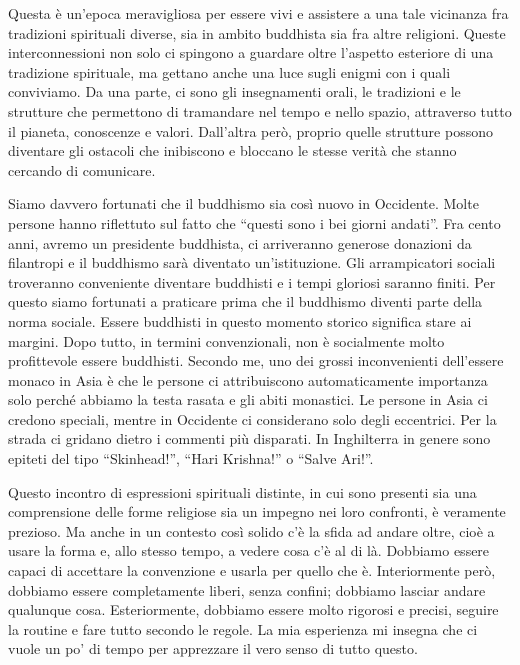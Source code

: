 Questa è un'epoca meravigliosa per essere vivi e assistere a una tale vicinanza fra tradizioni spirituali diverse, sia in ambito buddhista sia fra altre religioni. Queste interconnessioni non solo ci spingono a guardare oltre l'aspetto esteriore di una tradizione spirituale, ma gettano anche una luce sugli enigmi con i quali conviviamo. Da una parte, ci sono gli insegnamenti orali, le tradizioni e le strutture che permettono di tramandare nel tempo e nello spazio, attraverso tutto il pianeta, conoscenze e valori. Dall'altra però, proprio quelle strutture possono diventare gli ostacoli che inibiscono e bloccano le stesse verità che stanno cercando di comunicare. 

Siamo davvero fortunati che il buddhismo sia così nuovo in Occidente. Molte persone hanno riflettuto sul fatto che ``questi sono i bei giorni andati''. Fra cento anni, avremo un presidente buddhista, ci arriveranno generose donazioni da filantropi e il buddhismo sarà diventato un'istituzione. Gli arrampicatori sociali troveranno conveniente diventare buddhisti e i tempi gloriosi saranno finiti. Per questo siamo fortunati a praticare prima che il buddhismo diventi parte della norma sociale. Essere buddhisti in questo momento storico significa stare ai margini. Dopo tutto, in termini convenzionali, non è socialmente molto profittevole essere buddhisti. Secondo me, uno dei grossi inconvenienti dell'essere monaco in Asia è che le persone ci attribuiscono automaticamente importanza solo perché abbiamo la testa rasata e gli abiti monastici. Le persone in Asia ci credono speciali, mentre in Occidente ci considerano solo degli eccentrici. Per la strada ci gridano dietro i commenti più disparati. In Inghilterra in genere sono epiteti del tipo ``Skinhead!'', ``Hari Krishna!'' o ``Salve Ari!''.

Questo incontro di espressioni spirituali distinte, in cui sono presenti sia una comprensione delle forme religiose sia un impegno nei loro confronti, è veramente prezioso. Ma anche in un contesto così solido c'è la sfida ad andare oltre, cioè a usare la forma e, allo stesso tempo, a vedere cosa c'è al di là. Dobbiamo essere capaci di accettare la convenzione e usarla per quello che è. Interiormente però, dobbiamo essere completamente liberi, senza confini; dobbiamo lasciar andare qualunque cosa. Esteriormente, dobbiamo essere molto rigorosi e precisi, seguire la routine e fare tutto secondo le regole. La mia esperienza mi insegna che ci vuole un po' di tempo per apprezzare il vero senso di tutto questo.

